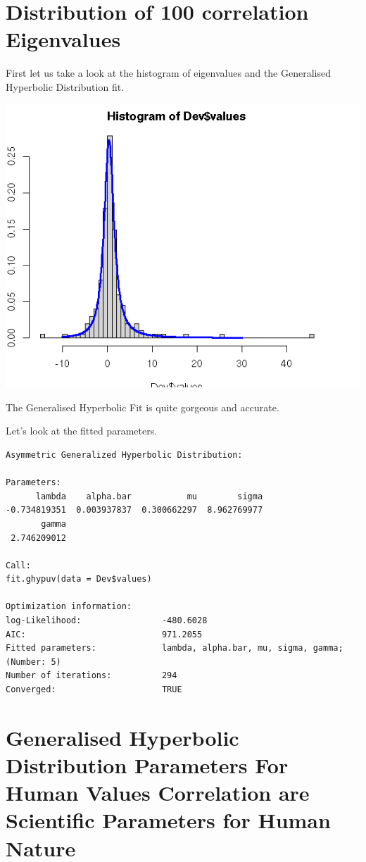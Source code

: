 \documentclass{amsart}
\begin{document}
\section{Distribution of 100 correlation Eigenvalues}

First let us take a look at the histogram of eigenvalues and the Generalised Hyperbolic Distribution fit.

\includegraphics[scale=0.8]{human_values_correl_hist.jpeg}

The Generalised Hyperbolic Fit is quite gorgeous and accurate.

Let's look at the fitted parameters.

\begin{verbatim}
Asymmetric Generalized Hyperbolic Distribution:

Parameters:
      lambda    alpha.bar           mu        sigma 
-0.734819351  0.003937837  0.300662297  8.962769977 
       gamma 
 2.746209012 

Call:
fit.ghypuv(data = Dev$values)

Optimization information:
log-Likelihood:                -480.6028 
AIC:                           971.2055 
Fitted parameters:             lambda, alpha.bar, mu, sigma, gamma;  (Number: 5)
Number of iterations:          294 
Converged:                     TRUE 
\end{verbatim}


\section{Generalised Hyperbolic Distribution Parameters For Human Values Correlation are Scientific Parameters for Human Nature}
\end{document}
